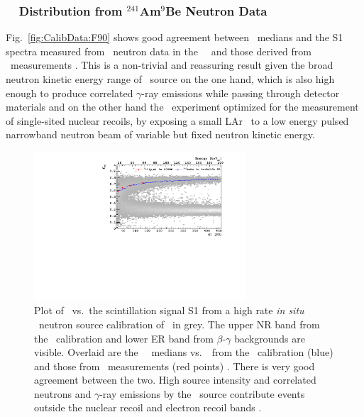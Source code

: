 \subsubsection{\tpc\ \FNinety\ Distribution from $^{241}$Am$^9$Be Neutron Data}\label{sec:CalibData:NR}
Fig.~\ref{fig:CalibData:F90} shows good agreement between \FNinety\ medians and the S1 spectra measured from \AmBe\ neutron data in the \dsf\ \tpc\ and those derived from \SCENE\ measurements \cite{Alexander:2013ke, Cao:2015ks}. This is a non-trivial and reassuring result given the broad neutron kinetic energy range of \AmBe\ source on the one hand, which is also high enough to produce correlated $\gamma$-ray emissions while passing through detector materials and on the other hand the \scene\ experiment optimized for the measurement of single-sited nuclear recoils, by exposing a small LAr \tpc\ to a low energy pulsed narrowband neutron beam of variable but fixed neutron kinetic energy.

\begin{figure}[htbp]
\centering
\includegraphics[width=0.7\textwidth]{./Figures/DSf-UArAmBeDMSStCut.pdf}
\caption{Plot of \FNinety\ vs.~the scintillation signal S1 from a high rate {\it in situ} \AmBe\ neutron source calibration of \dsf\ in grey. The upper NR band from the \AmBe\ calibration and lower ER band from $\beta$-$\gamma$ backgrounds are visible. Overlaid are the \FNinety\ \NR\ medians vs.~\SOne\ from the \AmBe\ calibration (blue) and those from \SCENE\ measurements (red points) \cite{Alexander:2013ke, Cao:2015ks}. There is very good agreement between the two.  High source intensity and correlated neutrons and $\gamma$-ray emissions by the \AmBe\ source contribute events outside the nuclear recoil and electron recoil bands \cite{Agnes:2015_uar}.\label{fig:CalibData:F90}\label{fig:DSf-UArAmBeDMS}} 
\end{figure}


